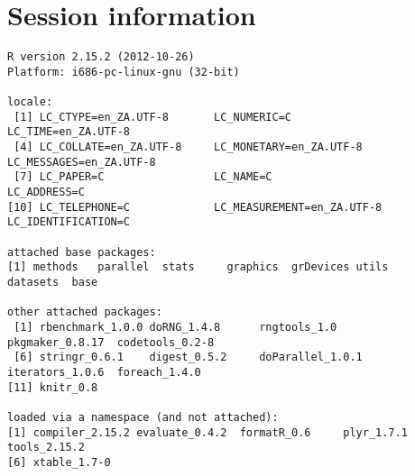 \documentclass[a4paper,12pt]{article}\usepackage{graphicx, color}
\makeatletter
\newenvironment{kframe}{%
 \def\at@end@of@kframe{}%
 \ifinner\ifhmode%
  \def\at@end@of@kframe{\end{minipage}}%
  \begin{minipage}{\columnwidth}%
 \fi\fi%
 \def\FrameCommand##1{\hskip\@totalleftmargin \hskip-\fboxsep
 \colorbox{shadecolor}{##1}\hskip-\fboxsep
     \hskip-\linewidth \hskip-\@totalleftmargin \hskip\columnwidth}%
 \MakeFramed {\advance\hsize-\width
   \@totalleftmargin\z@ \linewidth\hsize
   \@setminipage}}%
 {\par\unskip\endMakeFramed%
 \at@end@of@kframe}
\newenvironment{knitrout}{}{} %
\renewenvironment{knitrout}{\begin{footnotesize}}{\end{footnotesize}}
\makeatother
\begin{document}
\section*{Session information}
\begin{knitrout}
\color{fgcolor}\begin{kframe}
\begin{verbatim}
R version 2.15.2 (2012-10-26)
Platform: i686-pc-linux-gnu (32-bit)

locale:
 [1] LC_CTYPE=en_ZA.UTF-8       LC_NUMERIC=C               LC_TIME=en_ZA.UTF-8       
 [4] LC_COLLATE=en_ZA.UTF-8     LC_MONETARY=en_ZA.UTF-8    LC_MESSAGES=en_ZA.UTF-8   
 [7] LC_PAPER=C                 LC_NAME=C                  LC_ADDRESS=C              
[10] LC_TELEPHONE=C             LC_MEASUREMENT=en_ZA.UTF-8 LC_IDENTIFICATION=C       

attached base packages:
[1] methods   parallel  stats     graphics  grDevices utils     datasets  base     

other attached packages:
 [1] rbenchmark_1.0.0 doRNG_1.4.8      rngtools_1.0     pkgmaker_0.8.17  codetools_0.2-8 
 [6] stringr_0.6.1    digest_0.5.2     doParallel_1.0.1 iterators_1.0.6  foreach_1.4.0   
[11] knitr_0.8       

loaded via a namespace (and not attached):
[1] compiler_2.15.2 evaluate_0.4.2  formatR_0.6     plyr_1.7.1      tools_2.15.2   
[6] xtable_1.7-0   
\end{verbatim}
\end{kframe}
\end{knitrout}


\printbibliography[heading=bibintoc]
\end{document}
